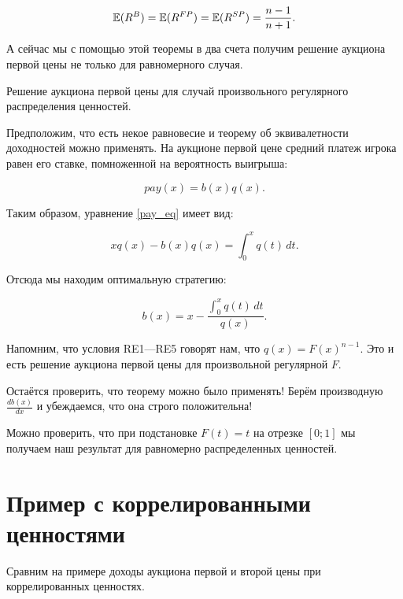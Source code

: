 \begin{equation}
\operatorname{\mathbb{E}}(R^{B})=\operatorname{\mathbb{E}}(R^{FP})=\operatorname{\mathbb{E}}(R^{SP})=\frac{n-1}{n+1}.
\end{equation}


А сейчас мы с помощью этой теоремы в два счета получим решение аукциона первой цены не только для равномерного случая.


\begin{myex} \label{use_ret} Решение аукциона первой цены для случай произвольного регулярного распределения ценностей.

Предположим, что есть некое равновесие и теорему об эквивалетности доходностей можно применять. На аукционе первой цене средний платеж игрока равен его ставке, помноженной на вероятность выигрыша:

\begin{equation}
\label{first_price_pay_eq}
pay(x)=b(x)q(x).
\end{equation}

Таким образом, уравнение \ref{pay_eq} имеет вид:

\begin{equation}
xq(x)-b(x)q(x)=\int_{0}^{x}q(t) \, dt.
\end{equation}

Отсюда мы находим оптимальную стратегию:

\begin{equation}
\label{first_price_b_eq}
b(x)=x-\frac{\int_{0}^{x}q(t) \, dt}{q(x)}.
\end{equation}

Напомним, что условия RE1—RE5 говорят нам, что $ q(x)=F(x)^{n-1} $. Это и есть решение аукциона первой цены для произвольной регулярной $ F $.

Остаётся проверить, что теорему можно было применять! Берём производную $ \frac{db(x)}{dx} $ и убеждаемся, что она строго положительна!

Можно проверить, что при подстановке $ F(t)=t $ на отрезке $ [0;1] $ мы получаем наш результат для равномерно распределенных ценностей.
\end{myex}




\section{Пример с коррелированными ценностями}


Сравним на примере доходы аукциона первой и второй цены при коррелированных ценностях.

